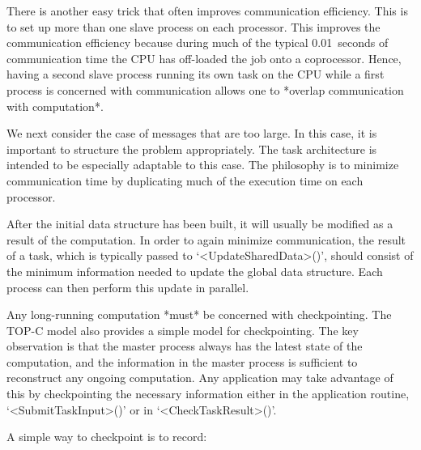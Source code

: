 There is another easy trick that often improves communication efficiency.
This is to set up more than one slave process  on  each  processor.  This
improves the communication efficiency because during much of the  typical
0.01~seconds of communication time the CPU has off-loaded the job onto  a
coprocessor. Hence, having a second slave process running its own task on
the CPU while a first process is concerned with communication allows  one
to *overlap communication with computation*.

We next consider the case of messages that are too large. In  this  case,
it  is  important  to  structure  the  problem  appropriately.  The  task
architecture is intended to be especially adaptable  to  this  case.  The
philosophy is to minimize communication time by duplicating much  of  the
execution time on each processor.


After the initial data structure has  been  built,  it  will  usually  be
modified as a result of the  computation.  In  order  to  again  minimize
communication, the result  of  a  task,  which  is  typically  passed  to
`<UpdateSharedData>()', should consist of the minimum information needed
to update the global data structure. Each process can then  perform  this
update in parallel.


Any long-running computation *must* be concerned with checkpointing. The
TOP-C model also provides a  simple  model  for  checkpointing.  The  key
observation is that the master process always has the latest state of the
computation, and the information in the master process is  sufficient  to
reconstruct any ongoing computation. Any application may  take  advantage
of  this  by  checkpointing  the  necessary  information  either  in  the
application routine, `<SubmitTaskInput>()' or in `<CheckTaskResult>()'.

A simple way to checkpoint is to record:

